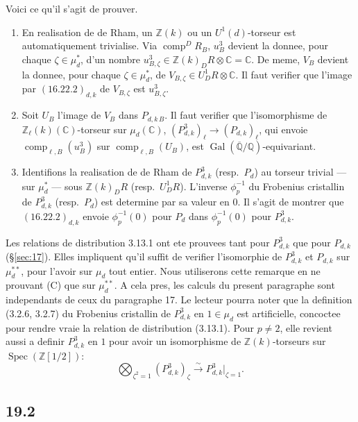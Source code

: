 \documentclass[12pt,a4paper]{article}
\theoremstyle{plain}
\theoremstyle{definition}
\theoremstyle{remark}
\DeclareMathOperator{\Spec}{Spec}
\DeclareMathOperator{\Gal}{Gal}
\DeclareMathOperator{\comp}{comp}
\newcommand{\Betti}{B}
\newcommand{\dR}{DR}
\newcommand{\ZZ}{\mathbb{Z}}
\newcommand{\QQ}{\mathbb{Q}}
\newcommand{\CC}{\mathbb{C}}
\begin{document}
Voici ce qu'il s'agit de prouver.
\begin{enumerate}
\item[(A)] En realisation de de Rham, un $\ZZ(k)$ ou un
$U^1(d)$-torseur est automatiquement trivialise. Via
$\comp^\dR_\Betti$, $u^3_\Betti$ devient la donnee, pour chaque
$\zeta \in \mu_d^*$, d'un nombre $u^3_{\Betti,\zeta} \in
\ZZ(k)_\dR \otimes \CC = \CC$. De meme, $V_\Betti$ devient la
donnee, pour chaque $\zeta \in \mu_d^*$, de $V_{\Betti,\zeta} \in
U^1_\dR \otimes \CC$. Il faut verifier que l'image par
$(16.22.2)_{d,k}$ de $V_{\Betti,\zeta}$ est $u^3_{\Betti,\zeta}$.
\item[(B)] Soit $U_\Betti$ l'image de $V_\Betti$ dans
$P_{d,k\,\Betti}$. Il faut verifier que l'isomorphisme de
$\ZZ_\ell(k)(\CC)$-torseur sur $\mu_d(\CC)$,
$(P^3_{d,k})_\ell \to (P_{d,k})_\ell$, qui envoie
$\comp_{\ell,\Betti}(u^3_\Betti)$ sur
$\comp_{\ell,\Betti}(U_\Betti)$, est $\Gal(\overline{\QQ}/\QQ)$-equivariant.
\item[(C)] Identifions la realisation de de Rham de $P^3_{d,k}$
(resp.\ $P_d$) au torseur trivial --- sur $\mu_d^*$ --- sous
$\ZZ(k)_\dR$ (resp.\ $U^1_\dR$). L'inverse $\phi_p^{-1}$ du
Frobenius cristallin de $P^3_{d,k}$ (resp.\ $P_d$) est determine par
sa valeur en $0$. Il s'agit de montrer que $(16.22.2)_{d,k}$ envoie
$\phi_p^{-1}(0)$ pour $P_d$ dans $\phi_p^{-1}(0)$ pour $P^3_{d,k}$.
\end{enumerate}

Les relations de distribution 3.13.1 ont ete prouvees tant pour
$P^3_{d,k}$ que pour $P_{d,k}$ (\S\ref{sec:17}). Elles impliquent qu'il
suffit de verifier l'isomorphie de $P^3_{d,k}$ et $P_{d,k}$ sur
$\mu_d^{**}$, pour l'avoir sur $\mu_d$ tout entier. Nous utiliserons
cette remarque en ne prouvant (C) que sur $\mu_d^{**}$. A cela pres,
les calculs du present paragraphe sont independants de ceux du
paragraphe 17. Le lecteur pourra noter que la definition (3.2.6,
3.2.7) du Frobenius cristallin de $P^3_{d,k}$ en $1 \in \mu_d$ est
artificielle, concoctee pour rendre vraie la relation de distribution
(3.13.1). Pour $p \neq 2$, elle revient aussi a definir $P^3_{d,k}$
en $1$ pour avoir un isomorphisme de $\ZZ(k)$-torseurs sur
$\Spec(\ZZ[1/2])$:
\[
\bigotimes_{\zeta^2=1} (P^3_{d,k})_\zeta \xrightarrow{\sim} P^3_{d,k}\big|_{\zeta=1}.
\]

\subsection{19.2}
\end{document}
